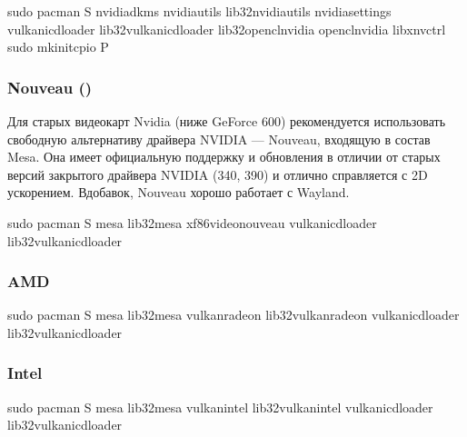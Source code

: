 \documentclass[letterpaper,10pt,russian,openany]{sphinxmanual}
\begin{document}
\begin{sphinxVerbatim}[commandchars=\\\{\}]
sudo pacman \PYGZhy{}S nvidia\PYGZhy{}dkms nvidia\PYGZhy{}utils lib32\PYGZhy{}nvidia\PYGZhy{}utils nvidia\PYGZhy{}settings vulkan\PYGZhy{}icd\PYGZhy{}loader lib32\PYGZhy{}vulkan\PYGZhy{}icd\PYGZhy{}loader lib32\PYGZhy{}opencl\PYGZhy{}nvidia opencl\PYGZhy{}nvidia libxnvctrl
sudo mkinitcpio \PYGZhy{}P 
\end{sphinxVerbatim}


\subsubsection{Nouveau ()}
\label{\detokenize{source/first-steps:nouveau}}
\sphinxAtStartPar
Для старых видеокарт Nvidia (ниже GeForce 600) рекомендуется использовать свободную альтернативу драйвера NVIDIA — Nouveau, входящую в состав Mesa.
Она имеет официальную поддержку и обновления в отличии от старых версий закрытого драйвера NVIDIA (340, 390) и отлично справляется с 2D ускорением.
Вдобавок, Nouveau хорошо работает с Wayland.

\begin{sphinxVerbatim}[commandchars=\\\{\}]
sudo pacman \PYGZhy{}S mesa lib32\PYGZhy{}mesa xf86\PYGZhy{}video\PYGZhy{}nouveau vulkan\PYGZhy{}icd\PYGZhy{}loader lib32\PYGZhy{}vulkan\PYGZhy{}icd\PYGZhy{}loader
\end{sphinxVerbatim}


\subsubsection{AMD}
\label{\detokenize{source/first-steps:amd}}
\begin{sphinxVerbatim}[commandchars=\\\{\}]
sudo pacman \PYGZhy{}S mesa lib32\PYGZhy{}mesa vulkan\PYGZhy{}radeon lib32\PYGZhy{}vulkan\PYGZhy{}radeon vulkan\PYGZhy{}icd\PYGZhy{}loader lib32\PYGZhy{}vulkan\PYGZhy{}icd\PYGZhy{}loader
\end{sphinxVerbatim}


\subsubsection{Intel}
\label{\detokenize{source/first-steps:intel}}
\begin{sphinxVerbatim}[commandchars=\\\{\}]
sudo pacman \PYGZhy{}S mesa lib32\PYGZhy{}mesa vulkan\PYGZhy{}intel lib32\PYGZhy{}vulkan\PYGZhy{}intel vulkan\PYGZhy{}icd\PYGZhy{}loader lib32\PYGZhy{}vulkan\PYGZhy{}icd\PYGZhy{}loader
\end{sphinxVerbatim}
\end{document}
